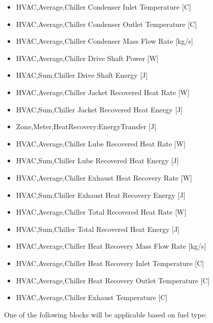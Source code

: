 \begin{itemize}
    \item
    HVAC,Average,Chiller Condenser Inlet Temperature {[}C{]}
    \item
    HVAC,Average,Chiller Condenser Outlet Temperature {[}C{]}
    \item
    HVAC,Average,Chiller Condenser Mass Flow Rate {[}kg/s{]}
    \item
    HVAC,Average,Chiller Drive Shaft Power {[}W{]}
    \item
    HVAC,Sum,Chiller Drive Shaft Energy {[}J{]}
    \item
    HVAC,Average,Chiller Jacket Recovered Heat Rate {[}W{]}
    \item
    HVAC,Sum,Chiller Jacket Recovered Heat Energy {[}J{]}
    \item
    Zone,Meter,HeatRecovery:EnergyTransfer {[}J{]}
    \item
    HVAC,Average,Chiller Lube Recovered Heat Rate {[}W{]}
    \item
    HVAC,Sum,Chiller Lube Recovered Heat Energy {[}J{]}
    \item
    HVAC,Average,Chiller Exhaust Heat Recovery Rate {[}W{]}
    \item
    HVAC,Sum,Chiller Exhaust Heat Recovery Energy {[}J{]}
    \item
    HVAC,Average,Chiller Total Recovered Heat Rate {[}W{]}
    \item
    HVAC,Sum,Chiller Total Recovered Heat Energy {[}J{]}
    \item
    HVAC,Average,Chiller Heat Recovery Mass Flow Rate {[}kg/s{]}
    \item
    HVAC,Average,Chiller Heat Recovery Inlet Temperature {[}C{]}
    \item
    HVAC,Average,Chiller Heat Recovery Outlet Temperature {[}C{]}
    \item
    HVAC,Average,Chiller Exhaust Temperature {[}C{]}
\end{itemize}

One of the following blocks will be applicable based on fuel type:

